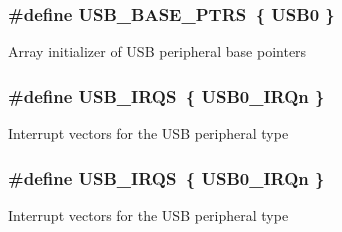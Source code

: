 \subsubsection[{\texorpdfstring{U\+S\+B\+\_\+\+B\+A\+S\+E\+\_\+\+P\+T\+RS}{USB_BASE_PTRS}}]{\setlength{\rightskip}{0pt plus 5cm}\#define U\+S\+B\+\_\+\+B\+A\+S\+E\+\_\+\+P\+T\+RS~\{ {\bf U\+S\+B0} \}}\hypertarget{group__USB__Peripheral__Access__Layer_gabb481a231c7c57907377d7ee985f826c}{}\label{group__USB__Peripheral__Access__Layer_gabb481a231c7c57907377d7ee985f826c}
Array initializer of U\+SB peripheral base pointers 
\subsubsection[{\texorpdfstring{U\+S\+B\+\_\+\+I\+R\+QS}{USB_IRQS}}]{\setlength{\rightskip}{0pt plus 5cm}\#define U\+S\+B\+\_\+\+I\+R\+QS~\{ {\bf U\+S\+B0\+\_\+\+I\+R\+Qn} \}}\hypertarget{group__USB__Peripheral__Access__Layer_ga17e92a5c4b8217467adbbc5ab517c72f}{}\label{group__USB__Peripheral__Access__Layer_ga17e92a5c4b8217467adbbc5ab517c72f}
Interrupt vectors for the U\+SB peripheral type 
\subsubsection[{\texorpdfstring{U\+S\+B\+\_\+\+I\+R\+QS}{USB_IRQS}}]{\setlength{\rightskip}{0pt plus 5cm}\#define U\+S\+B\+\_\+\+I\+R\+QS~\{ {\bf U\+S\+B0\+\_\+\+I\+R\+Qn} \}}\hypertarget{group__USB__Peripheral__Access__Layer_ga17e92a5c4b8217467adbbc5ab517c72f}{}\label{group__USB__Peripheral__Access__Layer_ga17e92a5c4b8217467adbbc5ab517c72f}
Interrupt vectors for the U\+SB peripheral type 
